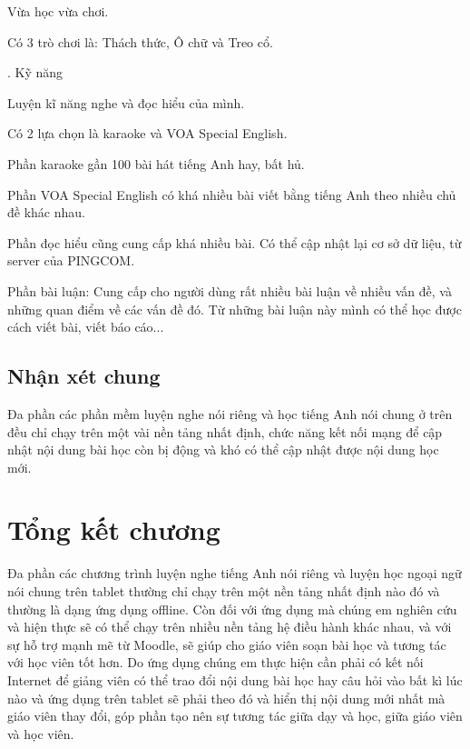Vừa học vừa chơi.

Có 3 trò chơi là: Thách thức, Ô chữ và Treo cổ.

. Kỹ năng

Luyện kĩ năng nghe và đọc hiểu của mình.

Có 2 lựa chọn là karaoke và VOA Special English.

Phần karaoke gần 100 bài hát tiếng Anh hay, bất hủ.

Phần VOA Special English có khá nhiều bài viết bằng tiếng Anh theo nhiều chủ đề khác nhau.

Phần đọc hiểu cũng cung cấp khá nhiều bài. Có thể cập nhật lại cơ sở dữ liệu, từ server của PINGCOM.

Phần bài luận: Cung cấp cho người dùng rất nhiều bài luận về nhiều vấn đề, và những quan điểm về các vấn đề đó. Từ những bài luận này mình có thể học được cách viết bài, viết báo cáo...




\subsection{Nhận xét chung}

Đa phần các phần mềm luyện nghe nói riêng và học tiếng Anh nói chung ở trên đều chỉ chạy trên một vài nền tảng nhất định, chức năng kết nối mạng để cập nhật nội dung bài học còn bị động và khó có thể cập nhật được nội dung học mới.

\section{Tổng kết chương}

Đa phần các chương trình luyện nghe tiếng Anh nói riêng và luyện học ngoại ngữ nói chung trên tablet thường chỉ chạy trên một nền tảng nhất định nào đó và thường là dạng ứng dụng offline. Còn đối với ứng dụng mà chúng em nghiên cứu và hiện thực sẽ có thể chạy trên nhiều nền tảng hệ điều hành khác nhau, và với sự hỗ trợ mạnh mẽ từ Moodle, sẽ giúp cho giáo viên soạn bài học và tương tác với học viên tốt hơn. Do ứng dụng chúng em thực hiện cần phải có kết nối Internet để giảng viên có thể trao đổi nội dung bài học hay câu hỏi vào bất kì lúc nào và ứng dụng trên tablet sẽ phải theo đó và hiển thị nội dung mới nhất mà giáo viên thay đổi, góp phần tạo nên sự tương tác giữa dạy và học, giữa giáo viên và học viên.